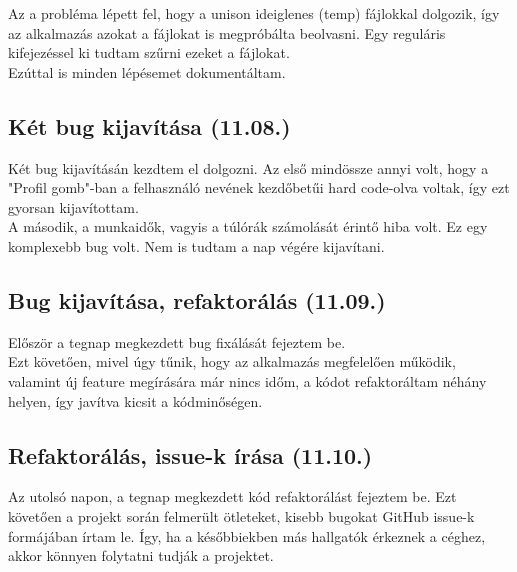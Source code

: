 \documentclass[a4paper]{article}
\begin{document}
Az a probléma lépett fel, hogy a unison ideiglenes (temp) fájlokkal dolgozik, így az alkalmazás azokat
a fájlokat is megpróbálta beolvasni. Egy reguláris kifejezéssel ki tudtam szűrni ezeket a fájlokat.\\

Ezúttal is minden lépésemet dokumentáltam.

\subsection{Két bug kijavítása (11.08.)}

Két bug kijavításán kezdtem el dolgozni. Az első mindössze annyi volt, hogy a "Profil gomb"-ban a
felhasználó nevének kezdőbetűi hard code-olva voltak, így ezt gyorsan kijavítottam.\\

A második, a munkaidők, vagyis a túlórák számolását érintő hiba volt. Ez egy komplexebb bug volt.
Nem is tudtam a nap végére kijavítani.

\subsection{Bug kijavítása, refaktorálás (11.09.)}

Először a tegnap megkezdett bug fixálását fejeztem be.\\

Ezt követően, mivel úgy tűnik, hogy az alkalmazás megfelelően működik, valamint új feature
megírására már nincs időm, a kódot refaktoráltam néhány helyen, így javítva kicsit a kódminőségen.

\subsection{Refaktorálás, issue-k írása (11.10.)}

Az utolsó napon, a tegnap megkezdett kód refaktorálást fejeztem be. Ezt követően a projekt során
felmerült ötleteket, kisebb bugokat GitHub issue-k formájában írtam le. Így, ha a későbbiekben más
hallgatók érkeznek a céghez, akkor könnyen folytatni tudják a projektet.


\end{document}
